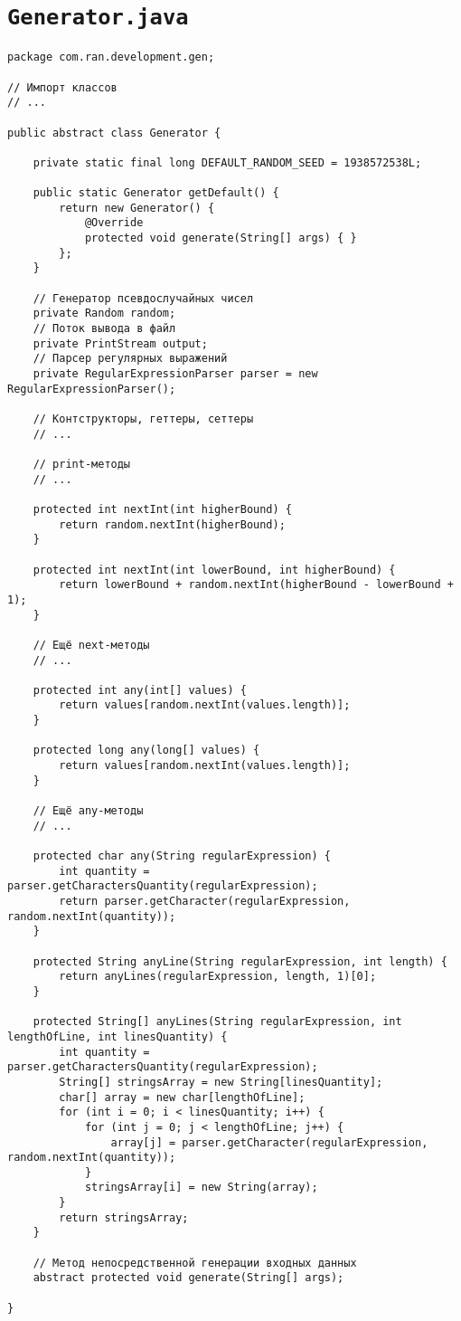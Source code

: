 \section*{\texttt{Generator.java}}
\begin{verbatim}
package com.ran.development.gen;

// Импорт классов
// ...

public abstract class Generator {

    private static final long DEFAULT_RANDOM_SEED = 1938572538L;
    
    public static Generator getDefault() {
        return new Generator() {
            @Override
            protected void generate(String[] args) { }
        };
    }
    
    // Генератор псевдослучайных чисел
    private Random random;
    // Поток вывода в файл
    private PrintStream output;
    // Парсер регулярных выражений
    private RegularExpressionParser parser = new RegularExpressionParser();
    
    // Контструкторы, геттеры, сеттеры
    // ...
    
    // print-методы
    // ...
    
    protected int nextInt(int higherBound) {
        return random.nextInt(higherBound);
    }
    
    protected int nextInt(int lowerBound, int higherBound) {
        return lowerBound + random.nextInt(higherBound - lowerBound + 1);
    }
    
    // Ещё next-методы
    // ...
    
    protected int any(int[] values) {
        return values[random.nextInt(values.length)];
    }
    
    protected long any(long[] values) {
        return values[random.nextInt(values.length)];
    }
    
    // Ещё any-методы
    // ...
    
    protected char any(String regularExpression) {
        int quantity = parser.getCharactersQuantity(regularExpression);
        return parser.getCharacter(regularExpression, random.nextInt(quantity));
    }
    
    protected String anyLine(String regularExpression, int length) {
        return anyLines(regularExpression, length, 1)[0];
    }
    
    protected String[] anyLines(String regularExpression, int lengthOfLine, int linesQuantity) {
        int quantity = parser.getCharactersQuantity(regularExpression);
        String[] stringsArray = new String[linesQuantity];
        char[] array = new char[lengthOfLine];
        for (int i = 0; i < linesQuantity; i++) {
            for (int j = 0; j < lengthOfLine; j++) {
                array[j] = parser.getCharacter(regularExpression, random.nextInt(quantity));
            }
            stringsArray[i] = new String(array);
        }
        return stringsArray;
    }
    
    // Метод непосредственной генерации входных данных
    abstract protected void generate(String[] args);
    
}
\end{verbatim}

